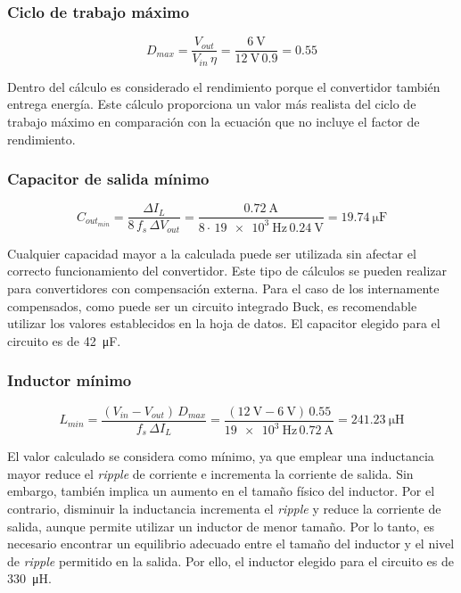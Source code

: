 \subsubsection{Ciclo de trabajo máximo}
\vspace{-0.25cm}
\begin{equation} \label{eq:buck:duty_cycle}
    D_{max} = \frac{V_{out}}{V_{in} \, \eta} = \frac{\SI{6}{\volt}}{\SI{12}{\volt} \, 0.9} = 0.55    
\end{equation}

Dentro del cálculo es considerado el rendimiento porque el convertidor también entrega energía. Este cálculo proporciona un valor más realista del ciclo de trabajo máximo en comparación con la ecuación que no incluye el factor de rendimiento.

\subsubsection{Capacitor de salida mínimo}
\vspace{-0.25cm}
\begin{equation} \label{eq:buck:capacitancia_salida}
    C_{out_{min}} = \frac{\Delta I_L}{8 \, f_s \, \Delta V_{out}} = \frac{\SI{0,72}{\ampere}}{8 \cdot \, \SI{19e3}{\hertz} \, \SI{0.24}{\volt}} = \SI{19.74}{\micro\farad}
\end{equation}

Cualquier capacidad mayor a la calculada puede ser utilizada sin afectar el correcto funcionamiento del convertidor. Este tipo de cálculos se pueden realizar para convertidores con compensación externa. Para el caso de los internamente compensados, como puede ser un circuito integrado Buck, es recomendable utilizar los valores establecidos en la hoja de datos. El capacitor elegido para el circuito es de \SI{42}{\micro\farad}.

\subsubsection{Inductor mínimo}
\vspace{-0.25cm}
\begin{equation} \label{eq:buck:inductancia_minima}
    L_{min} = \frac{(V_{in}-V_{out}) \, D_{max}}{f_s \, \Delta I_L} = \frac{(\SI{12}{\volt} - \SI{6}{\volt}) \, 0.55}{\SI{19e3}{\hertz} \, \SI{0.72}{\ampere}} = \SI{241.23}{\micro\henry}
\end{equation}

El valor calculado se considera como mínimo, ya que emplear una inductancia mayor reduce el \textit{ripple} de corriente e incrementa la corriente de salida. Sin embargo, también implica un aumento en el tamaño físico del inductor. Por el contrario, disminuir la inductancia incrementa el \textit{ripple} y reduce la corriente de salida, aunque permite utilizar un inductor de menor tamaño. Por lo tanto, es necesario encontrar un equilibrio adecuado entre el tamaño del inductor y el nivel de \textit{ripple} permitido en la salida. Por ello, el inductor elegido para el circuito es de \SI{330}{\micro\henry}.

